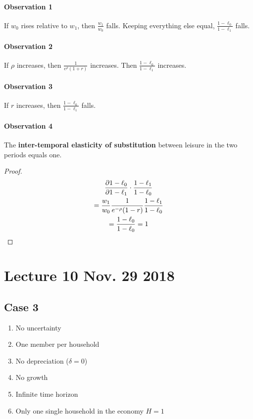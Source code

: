 \documentclass[11pt]{article}
\begin{document}
					\paragraph{Observation 1} If $w_0$ rises relative to $w_1$, then $\frac{w_1}{w_0}$ falls. Keeping everything else equal, $\frac{1-\ell_0}{1-\ell_1}$ falls.
					\paragraph{Observation 2} If $\rho$ increases, then $\frac{1}{e^{\rho}(1+r)}$ increases. Then $\frac{1-\ell_0}{1-\ell_1}$ increases.
					\paragraph{Observation 3} If $r$ increases, then $\frac{1-\ell_0}{1-\ell_1}$ falls.
					\paragraph{Observation 4} The \textbf{inter-temporal  elasticity of substitution} between leisure in the two periods equals one.
					\begin{proof}
						\begin{gather}
							\frac{\partial{1-\ell_0}}{\partial{1-\ell_1}} \cdot \frac{1-\ell_1}{1-\ell_0} \\
							= \frac{w_1}{w_0} \frac{1}{e^{-\rho}(1-r)} \frac{1-\ell_1}{1-\ell_0} \\
							= \frac{1-\ell_0}{1-\ell_0} = 1
						\end{gather}
					\end{proof}
	\section{Lecture 10 Nov. 29 2018}
		\subsection{Case 3}
			\begin{assumption} \quad
				\begin{enumerate}
					\item No uncertainty 
					\item One member per household
					\item No depreciation ($\delta = 0$)
					\item No growth
					\item Infinite time horizon
					\item Only one single household in the economy $H=1$
				\end{enumerate}
			\end{assumption}
			
\end{document}
